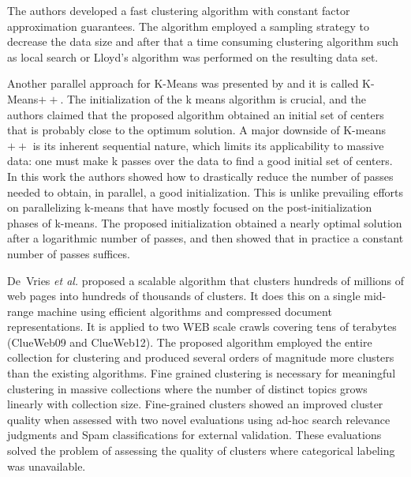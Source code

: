 \documentclass[10pt]{article}
\begin{document}
The authors developed a fast clustering algorithm with constant factor approximation guarantees. The algorithm employed a sampling strategy to decrease the data size and after that a time consuming clustering algorithm such as local search or Lloyd's algorithm was performed on the resulting data set. 

Another parallel approach for K-Means was presented by \citep{BMVKV12} and it is called K-Means$++$. The initialization of the k means algorithm is crucial, and the authors claimed that the proposed algorithm obtained an initial set of centers that is probably close to the optimum solution. A major downside of K-means$++$ is its inherent sequential nature, which limits its applicability to massive data: one must make k passes over the data to find a good initial set of centers. In this work the
authors showed how to drastically reduce the number of passes needed to obtain, in parallel, a good initialization. This is unlike prevailing efforts on parallelizing k-means that have mostly focused on the post-initialization phases of k-means. The proposed initialization obtained a nearly optimal solution after a logarithmic number of passes, and then showed that in practice a constant number of passes suffices. 

De~Vries \textit{et al.} \citep{DDGN15} proposed a scalable algorithm that clusters hundreds of millions of web pages into hundreds of thousands of clusters. It does this on a single mid-range machine using efficient algorithms and compressed document representations. It is applied to two WEB scale crawls covering tens of terabytes (ClueWeb09 and ClueWeb12). %
The proposed algorithm employed the entire collection for clustering and produced several orders of magnitude more clusters than the existing algorithms. Fine grained clustering is necessary for meaningful clustering in massive collections where the number of distinct topics grows linearly with collection size. Fine-grained clusters showed an improved cluster quality when assessed with two novel evaluations using ad-hoc search relevance judgments and Spam classifications for external validation. These evaluations solved the problem of assessing the quality of clusters where categorical labeling was unavailable.
\end{document}
